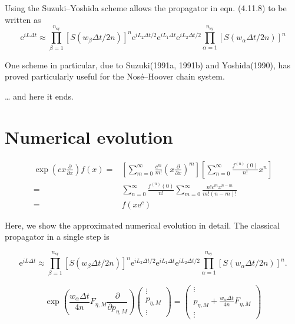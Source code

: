 \documentclass[11pt,a4paper]{article}
\begin{document}
	Using the Suzuki–Yoshida scheme allows the propagator in eqn. (4.11.8) to be written as
	$$\mathrm{e}^{i L \Delta t} \approx \prod_{\beta=1}^{n_{\mathrm{sy}}}\left[S\left(w_{\beta} \Delta t / 2 n\right)\right]^{n} \mathrm{e}^{i L_{2} \Delta t / 2} \mathrm{e}^{i L_{1} \Delta t} \mathrm{e}^{i L_{2} \Delta t / 2} \prod_{\alpha=1}^{n_{\mathrm{sy}}}\left[S\left(w_{\alpha} \Delta t / 2 n\right)\right]^{n}$$
	
	
	One scheme in particular, due to Suzuki(1991a, 1991b) and Yoshida(1990), has proved particularly useful for the Nosé–Hoover chain system.
	
	
	\ldots{} and here it ends.
	
	\section{Numerical evolution}
	\[
	\begin{aligned}
	\exp \left(c x \frac{\partial}{\partial x}\right) f(x) =& \left[\sum_{m=0}^{\infty} \frac{c^{m}}{m !}\left(x \frac{\partial}{\partial x}\right)^{m}\right] \left[\sum_{n=0}^{\infty} \frac{f^{(n)}(0)}{n !} x^{n}\right] \\
	=& \sum_{n=0}^{\infty} \frac{f^{(n)}(0)}{n !} \sum_{m=0}^{\infty} \frac{n! c^{m} x^{n-m}}{m! (n-m)!} \\
	=& f(x \mathrm{e}^{c})
	\end{aligned}
	\]
	
	Here, we show the approximated numerical evolution in detail. The classical propagator in a single step is
	
		$$\mathrm{e}^{i L \Delta t} \approx \prod_{\beta=1}^{n_{\mathrm{sy}}}\left[S\left(w_{\beta} \Delta t / 2 n\right)\right]^{n} \mathrm{e}^{i L_{2} \Delta t / 2} \mathrm{e}^{i L_{1} \Delta t} \mathrm{e}^{i L_{2} \Delta t / 2} \prod_{\alpha=1}^{n_{\mathrm{sy}}}\left[S\left(w_{\alpha} \Delta t / 2 n\right)\right]^{n}.$$
	
	\[\exp \left( {\frac{{{w_\alpha }\Delta t}}{{4n}}{F_{\eta ,M}}\frac{\partial }{{\partial {p_{\eta ,M}}}}} \right)\left( {\begin{array}{*{20}{c}}
		\vdots  \\ 
		{{p_{\eta ,M}}} \\ 
		\vdots  
		\end{array}} \right) = \left( {\begin{array}{*{20}{c}}
		\vdots  \\ 
		{{p_{\eta ,M}} + \frac{{{w_\alpha }\Delta t}}{{4n}}{F_{\eta ,M}}} \\ 
		\vdots  
		\end{array}} \right)
	\]
	
\end{document}
